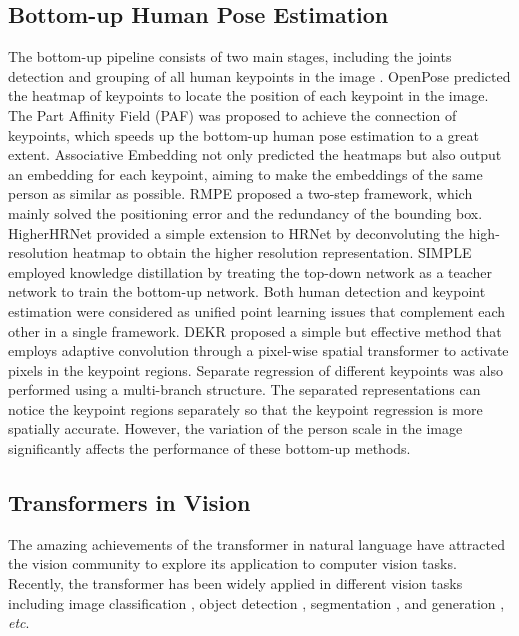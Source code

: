 \documentclass[runningheads]{llncs}
\begin{document}
\subsection{Bottom-up Human Pose Estimation}
The bottom-up pipeline consists of two main stages, including the joints detection and grouping of all human keypoints in the image \cite{0penpose2017,associative2017,RMPE2017,Higherhrnet2020,Simple2021,DEKR2021}. OpenPose \cite{0penpose2017} predicted the heatmap of keypoints to locate the position of each keypoint in the image. The Part Affinity Field (PAF) was proposed to achieve the connection of keypoints, which speeds up the bottom-up human pose estimation to a great extent. Associative Embedding \cite{associative2017} not only predicted the heatmaps but also output an embedding for each keypoint, aiming to make the embeddings of the same person as similar as possible. RMPE \cite{RMPE2017} proposed a two-step framework, which mainly solved the positioning error and the redundancy of the bounding box. HigherHRNet \cite{Higherhrnet2020} provided a simple extension to HRNet \cite{HRNet2019} by deconvoluting the high-resolution heatmap to obtain the higher resolution representation. SIMPLE \cite{Simple2021} employed knowledge distillation by treating the top-down network as a teacher network to train the bottom-up network. Both human detection and keypoint estimation were considered as unified point learning issues that complement each other in a single framework. DEKR \cite{DEKR2021} proposed a simple but effective method that employs adaptive convolution through a pixel-wise spatial transformer to activate pixels in the keypoint regions. Separate regression of different keypoints was also performed using a multi-branch structure. The separated representations can notice the keypoint regions separately so that the keypoint regression is more spatially accurate. However, the variation of the person scale in the image significantly affects the performance of these bottom-up methods.

\subsection{Transformers in Vision}
The amazing achievements of the transformer in natural language have attracted the vision community to explore its application to computer vision tasks. Recently, the transformer has been widely applied in different vision tasks including image classification \cite{VIT2020}, object detection \cite{DETR2020,deformable2020}, segmentation \cite{segformer2021,segmenter2021}, and generation \cite{sceneformer2021}, \textit{etc}.
\end{document}
